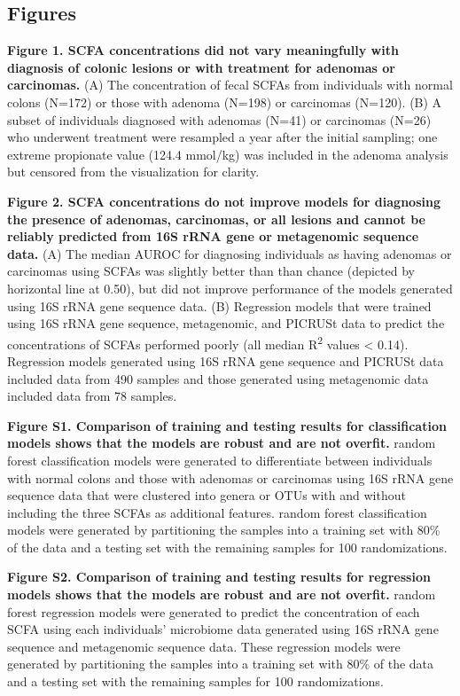 \documentclass[11pt,]{article}
\begin{document}
\newpage

\hypertarget{figures}{%
\subsection{Figures}\label{figures}}

\textbf{Figure 1. SCFA concentrations did not vary meaningfully with
diagnosis of colonic lesions or with treatment for adenomas or
carcinomas.} (A) The concentration of fecal SCFAs from individuals with
normal colons (N=172) or those with adenoma (N=198) or carcinomas
(N=120). (B) A subset of individuals diagnosed with adenomas (N=41) or
carcinomas (N=26) who underwent treatment were resampled a year after
the initial sampling; one extreme propionate value (124.4 mmol/kg) was
included in the adenoma analysis but censored from the visualization for
clarity.

\textbf{Figure 2. SCFA concentrations do not improve models for
diagnosing the presence of adenomas, carcinomas, or all lesions and
cannot be reliably predicted from 16S rRNA gene or metagenomic sequence
data.} (A) The median AUROC for diagnosing individuals as having
adenomas or carcinomas using SCFAs was slightly better than than chance
(depicted by horizontal line at 0.50), but did not improve performance
of the models generated using 16S rRNA gene sequence data. (B)
Regression models that were trained using 16S rRNA gene sequence,
metagenomic, and PICRUSt data to predict the concentrations of SCFAs
performed poorly (all median R\textsuperscript{2} values \textless{}
0.14). Regression models generated using 16S rRNA gene sequence and
PICRUSt data included data from 490 samples and those generated using
metagenomic data included data from 78 samples.

\textbf{Figure S1. Comparison of training and testing results for
classification models shows that the models are robust and are not
overfit.} random forest classification models were generated to
differentiate between individuals with normal colons and those with
adenomas or carcinomas using 16S rRNA gene sequence data that were
clustered into genera or OTUs with and without including the three SCFAs
as additional features. random forest classification models were
generated by partitioning the samples into a training set with 80\% of
the data and a testing set with the remaining samples for 100
randomizations.

\textbf{Figure S2. Comparison of training and testing results for
regression models shows that the models are robust and are not overfit.}
random forest regression models were generated to predict the
concentration of each SCFA using each individuals' microbiome data
generated using 16S rRNA gene sequence and metagenomic sequence data.
These regression models were generated by partitioning the samples into
a training set with 80\% of the data and a testing set with the
remaining samples for 100 randomizations.
\end{document}
